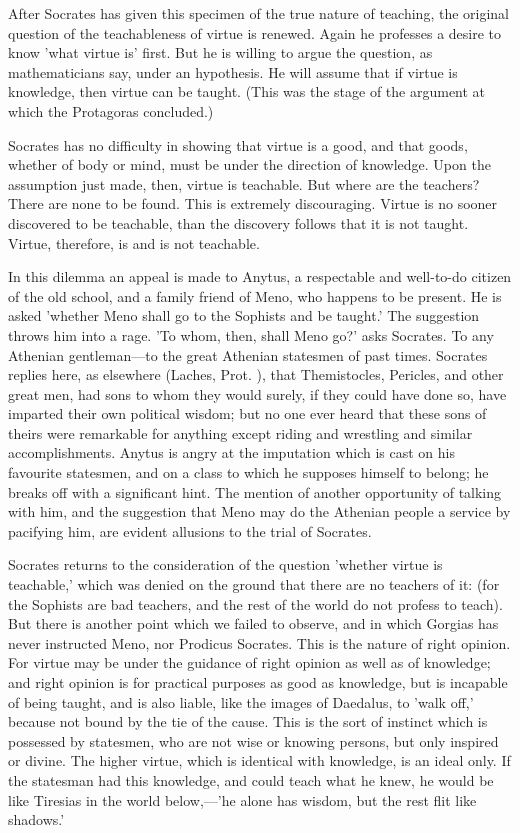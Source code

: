 \documentclass[11pt,letter]{article}
\begin{document}
\par  After Socrates has given this specimen of the true nature of teaching, the original question of the teachableness of virtue is renewed. Again he professes a desire to know 'what virtue is' first. But he is willing to argue the question, as mathematicians say, under an hypothesis. He will assume that if virtue is knowledge, then virtue can be taught. (This was the stage of the argument at which the Protagoras concluded.)

\par  Socrates has no difficulty in showing that virtue is a good, and that goods, whether of body or mind, must be under the direction of knowledge. Upon the assumption just made, then, virtue is teachable. But where are the teachers? There are none to be found. This is extremely discouraging. Virtue is no sooner discovered to be teachable, than the discovery follows that it is not taught. Virtue, therefore, is and is not teachable.

\par  In this dilemma an appeal is made to Anytus, a respectable and well-to-do citizen of the old school, and a family friend of Meno, who happens to be present. He is asked 'whether Meno shall go to the Sophists and be taught.' The suggestion throws him into a rage. 'To whom, then, shall Meno go?' asks Socrates. To any Athenian gentleman—to the great Athenian statesmen of past times. Socrates replies here, as elsewhere (Laches, Prot. ), that Themistocles, Pericles, and other great men, had sons to whom they would surely, if they could have done so, have imparted their own political wisdom; but no one ever heard that these sons of theirs were remarkable for anything except riding and wrestling and similar accomplishments. Anytus is angry at the imputation which is cast on his favourite statesmen, and on a class to which he supposes himself to belong; he breaks off with a significant hint. The mention of another opportunity of talking with him, and the suggestion that Meno may do the Athenian people a service by pacifying him, are evident allusions to the trial of Socrates.

\par  Socrates returns to the consideration of the question 'whether virtue is teachable,' which was denied on the ground that there are no teachers of it: (for the Sophists are bad teachers, and the rest of the world do not profess to teach). But there is another point which we failed to observe, and in which Gorgias has never instructed Meno, nor Prodicus Socrates. This is the nature of right opinion. For virtue may be under the guidance of right opinion as well as of knowledge; and right opinion is for practical purposes as good as knowledge, but is incapable of being taught, and is also liable, like the images of Daedalus, to 'walk off,' because not bound by the tie of the cause. This is the sort of instinct which is possessed by statesmen, who are not wise or knowing persons, but only inspired or divine. The higher virtue, which is identical with knowledge, is an ideal only. If the statesman had this knowledge, and could teach what he knew, he would be like Tiresias in the world below,—'he alone has wisdom, but the rest flit like shadows.'
\end{document}
